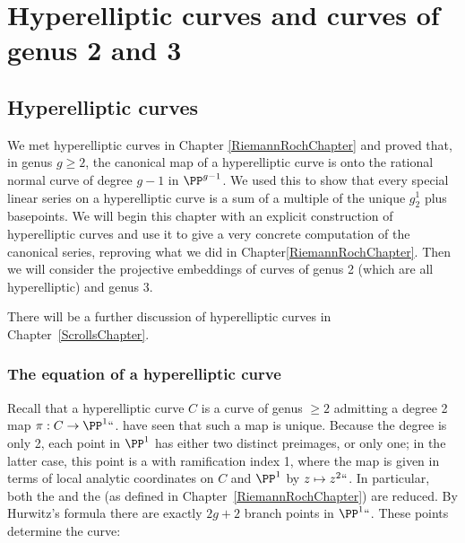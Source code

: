 

\chapter{Hyperelliptic curves and curves of genus 2 and 3}
\label{genus 2 and 3 chapter}

\section{Hyperelliptic curves}
\label{hyperelliptic}

We met hyperelliptic curves in Chapter
\ref{RiemannRochChapter} and proved
that, in genus
%
$g \geq 2$, the canonical
map of a hyperelliptic curve is
onto the rational normal curve
of degree $g-1$ in $\PP^{g-1}$. We used this to show that every special
linear series on a hyperelliptic curve is a sum of a multiple of  the
unique $g^1_2$ plus basepoints. We will begin this chapter with an
explicit construction of hyperelliptic curves and use it to give a very
concrete computation of the canonical series, reproving what we did in
Chapter\ref{RiemannRochChapter}.
Then we will consider the projective embeddings of curves of
genus 2 (which are all hyperelliptic) and genus 3.

There will be a further discussion of hyperelliptic curves in
Chapter~\ref{ScrollsChapter}.

\subsection*{The equation of a hyperelliptic curve}

Recall that a hyperelliptic curve $C$ is a curve of genus $\geq 2$
admitting a degree 2 map $\pi : C \to \PP^1` `$.
have seen that
such a map is unique. Because the degree is only 2, each point in $\PP^1$
has either two distinct preimages, or only one; in the latter case,
this point is a
%
with ramification index 1, where the
map is given in terms of local analytic coordinates on $C$ and $\PP^1$
by $z \mapsto z^2` `$. In particular, both the
%
and
the
%
(as defined in Chapter~\ref{RiemannRochChapter}) are
reduced. By 
Hurwitz's formula
%
there are exactly $2g+2$ branch points
in $\PP^1` `$. These points determine the curve:


